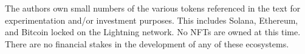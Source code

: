 The authors own small numbers of the various tokens referenced in the text for experimentation and/or investment purposes. This includes Solana, Ethereum, and Bitcoin locked on the Lightning network. No NFTs are owned at this time. There are no financial stakes in the development of any of these ecosystems.
